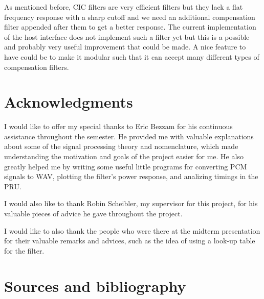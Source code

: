\documentclass[]{report}
\begin{document}
As mentioned before, CIC filters are very efficient filters but they lack a flat frequency response with a sharp cutoff and we need an additional compensation filter appended after them to get a better response. The current implementation of the host interface does not implement such a filter yet but this is a possible and probably very useful improvement that could be made. A nice feature to have could be to make it modular such that it can accept many different types of compensation filters.

\hypertarget{acknowledgments}{%
\chapter{Acknowledgments}\label{acknowledgments}}

I would like to offer my special thanks to Eric Bezzam for his continuous assistance throughout the semester. He provided me with valuable explanations about some of the signal processing theory and nomenclature, which made understanding the motivation and goals of the project easier for me. He also greatly helped me by writing some useful little programs for converting PCM signals to WAV, plotting the filter's power response, and analizing timings in the PRU.

I would also like to thank Robin Scheibler, my supervisor for this project, for his valuable pieces of advice he gave throughout the project.

I would like to also thank the people who were there at the midterm presentation for their valuable remarks and advices, such as the idea of using a look-up table for the filter.

\hypertarget{sources-and-bibliography}{%
\chapter*{Sources and bibliography}\label{sources-and-bibliography}}
\end{document}
